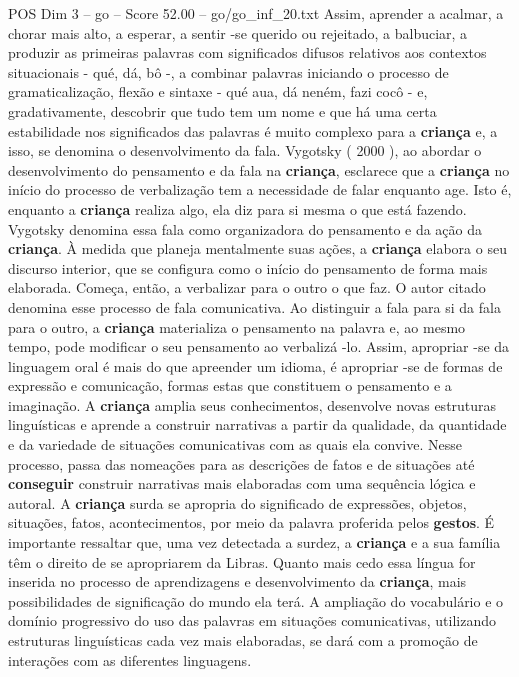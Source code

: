 \begin{textsample}{POS Dim 3 – go – Score 52.00 – go/go\_inf\_20.txt}
Assim, aprender a acalmar, a chorar mais alto, a esperar, a sentir -se querido ou rejeitado, a balbuciar, a produzir as primeiras palavras com significados difusos relativos aos contextos situacionais - qué, dá, bô -, a combinar palavras iniciando o processo de gramaticalização, flexão e sintaxe - qué aua, dá neném, fazi cocô - e, gradativamente, descobrir que tudo tem um nome e que há uma certa estabilidade nos significados das palavras é muito complexo para a \textbf{criança} e, a isso, se denomina o desenvolvimento da fala.
Vygotsky ( 2000 ), ao abordar o desenvolvimento do pensamento e da fala na \textbf{criança}, esclarece que a \textbf{criança} no início do processo de verbalização tem a necessidade de falar enquanto age.
Isto é, enquanto a \textbf{criança} realiza algo, ela diz para si mesma o que está fazendo.
Vygotsky denomina essa fala como organizadora do pensamento e da ação da \textbf{criança}.
À medida que planeja mentalmente suas ações, a \textbf{criança} elabora o seu discurso interior, que se configura como o início do pensamento de forma mais elaborada.
Começa, então, a verbalizar para o outro o que faz.
O autor citado denomina esse processo de fala comunicativa.
Ao distinguir a fala para si da fala para o outro, a \textbf{criança} materializa o pensamento na palavra e, ao mesmo tempo, pode modificar o seu pensamento ao verbalizá -lo.
Assim, apropriar -se da linguagem oral é mais do que apreender um idioma, é apropriar -se de formas de expressão e comunicação, formas estas que constituem o pensamento e a imaginação.
A \textbf{criança} amplia seus conhecimentos, desenvolve novas estruturas linguísticas e aprende a construir narrativas a partir da qualidade, da quantidade e da variedade de situações comunicativas com as quais ela convive.
Nesse processo, passa das nomeações para as descrições de fatos e de situações até \textbf{conseguir} construir narrativas mais elaboradas com uma sequência lógica e autoral.
A \textbf{criança} surda se apropria do significado de expressões, objetos, situações, fatos, acontecimentos, por meio da palavra proferida pelos \textbf{gestos}.
É importante ressaltar que, uma vez detectada a surdez, a \textbf{criança} e a sua família têm o direito de se apropriarem da Libras.
Quanto mais cedo essa língua for inserida no processo de aprendizagens e desenvolvimento da \textbf{criança}, mais possibilidades de significação do mundo ela terá.
A ampliação do vocabulário e o domínio progressivo do uso das palavras em situações comunicativas, utilizando estruturas linguísticas cada vez mais elaboradas, se dará com a promoção de interações com as diferentes linguagens.

\end{textsample}
